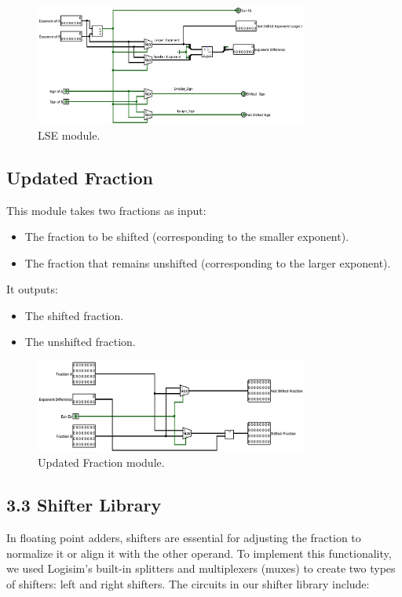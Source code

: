 \documentclass{article}
\begin{document}
\begin{figure}[h!]
\centering
\includegraphics[width=0.8\textwidth]{LSE.jpg} %
\caption{LSE module.}
\label{fig:lse_module}
\end{figure}

\subsection*{Updated Fraction}
This module takes two fractions as input:
\begin{itemize}
    \item The fraction to be shifted (corresponding to the smaller exponent).
    \item The fraction that remains unshifted (corresponding to the larger exponent).
\end{itemize}
It outputs:
\begin{itemize}
    \item The shifted fraction.
    \item The unshifted fraction.
\end{itemize}

\begin{figure}[h!]
\centering
\includegraphics[width=0.8\textwidth]{Updated_fraction.jpg} %
\caption{Updated Fraction module.}
\label{fig:updated_fraction}
\end{figure}
\subsection*{3.3 Shifter Library}
In floating point adders, shifters are essential for adjusting the fraction to normalize it or align it with the other operand. To implement this functionality, we used Logisim’s built-in splitters and multiplexers (muxes) to create two types of shifters: left and right shifters. The circuits in our shifter library include:
\end{document}
